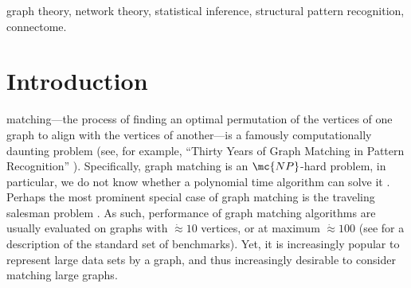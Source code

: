 \documentclass[10pt,journal,cspaper,compsoc]{IEEEtran}
\begin{document}
{%
\begin{keywords}
graph theory, network theory, statistical inference, structural pattern recognition, connectome.
\end{keywords}}


\maketitle
\IEEEdisplaynotcompsoctitleabstractindextext
\IEEEpeerreviewmaketitle



\section{Introduction}

 matching---the process of finding an optimal permutation of the vertices of one graph to align with the vertices of another---is a famously computationally daunting problem (see, for example, ``Thirty Years of Graph Matching in Pattern Recognition''  \cite{Conte2004}). Specifically, graph matching is an $\mc{NP}$-hard problem, in particular, we do not know whether a polynomial time algorithm can solve it \cite{Papadimitriou1998}.  Perhaps the most prominent special case of graph matching is the traveling salesman problem \cite{Burkard2009}. As such, performance of graph matching algorithms are usually evaluated on graphs with $\dot{\approx} 10$ vertices, or at maximum $\dot{\approx} 100$ (see \cite{Burkard1997} for a description of the standard set of benchmarks).  Yet, it is increasingly popular to represent large data sets by a graph, and thus increasingly desirable to consider matching large graphs.  
\end{document}
